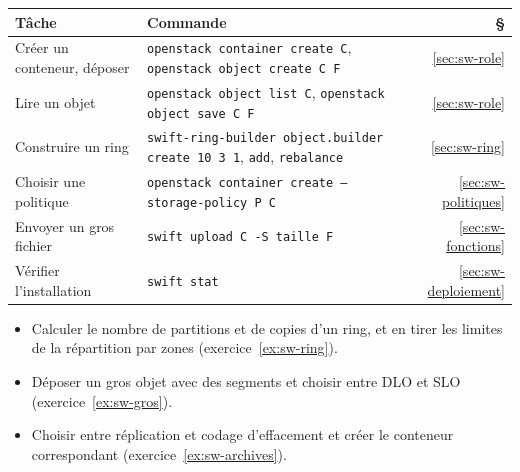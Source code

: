 \begin{center}
\renewcommand{\arraystretch}{1.35}
\begin{tabular}{@{}>{\raggedright\arraybackslash}p{4.2cm}>{\raggedright\arraybackslash}p{9.9cm}r@{}}
\toprule
\textbf{Tâche} & \textbf{Commande} & \textbf{§} \\
\midrule
Créer un conteneur, déposer & \texttt{openstack container create C}, \texttt{openstack object create C F} & \ref{sec:sw-role} \\
Lire un objet & \texttt{openstack object list C}, \texttt{openstack object save C F} & \ref{sec:sw-role} \\
Construire un ring & \texttt{swift-ring-builder object.builder create 10 3 1}, \texttt{add}, \texttt{rebalance} & \ref{sec:sw-ring} \\
Choisir une politique & \texttt{openstack container create --storage-policy P C} & \ref{sec:sw-politiques} \\
Envoyer un gros fichier & \texttt{swift upload C -S taille F} & \ref{sec:sw-fonctions} \\
Vérifier l'installation & \texttt{swift stat} & \ref{sec:sw-deploiement} \\
\bottomrule
\end{tabular}
\end{center}

\begin{savoirfaire}
\begin{itemize}
  \item Calculer le nombre de partitions et de copies d'un ring, et en tirer les limites de la répartition par zones
        (exercice~\ref{ex:sw-ring}).
  \item Déposer un gros objet avec des segments et choisir entre DLO et SLO (exercice~\ref{ex:sw-gros}).
  \item Choisir entre réplication et codage d'effacement et créer le conteneur correspondant (exercice~\ref{ex:sw-archives}).
\end{itemize}
\end{savoirfaire}
